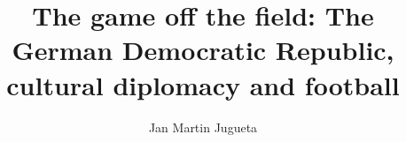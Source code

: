 \documentclass[logo]{style/usydthesis}
\begin{document}
\renewcommand{\thepage}{\roman{page}}	
\title{{\bf\Huge The game off the field: The German Democratic Republic, cultural diplomacy and football}}
\author{Jan Martin Jugueta}

\maketitle
{}






\setcounter{tocdepth}{2}
\newpage
{}
\tableofcontents
\listoffigures


\setcounter{page}{1}


\renewcommand{\thepage}{\arabic{page}}	
\setupParagraphs
\setcounter{chapter}{0}








%
%
\printbibliography

\appendix

\end{document}
